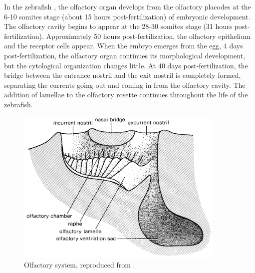     In the zebrafish \cite{hansen1993development,miyasaka2013functional}, the olfactory organ develops from the olfactory placodes at the 6-10 somites stage (about 15 hours post-fertilization) of embryonic development. The olfactory cavity begins to appear at the 28-30 somites stage (31 hours post-fertilization). Approximately 50 hours post-fertilization, the olfactory epithelium and the receptor cells appear. When the embryo emerges from the egg, 4 days post-fertilization, the olfactory organ continues its morphological development, but the cytological organization changes little. At 40 days post-fertilization, the bridge between the entrance nostril and the exit nostril is completely formed, separating the currents going out and coming in from the olfactory cavity. The addition of lamellae to the olfactory rosette continues throughout the life of the zebrafish.

    \begin{figure}[!h]
      \centering
      \includegraphics[width=10cm]{part_2/assets/olfactory_schematic.png}
      \caption{Olfactory system, reproduced from \cite{hara2012fish}.}
      \label{olfactory_schematic}
    \end{figure}

